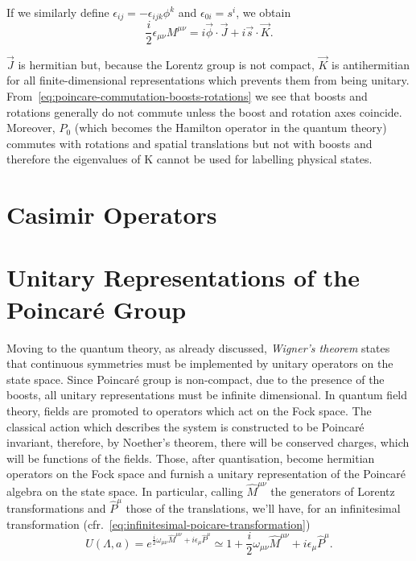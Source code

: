 If we similarly define $\epsilon_{ij} = - \epsilon_{ijk} \phi^k$ and $\epsilon_{0i} = s^i$, we obtain
\begin{equation}
    \frac{i}{2} \epsilon_{\mu\nu} M^{\mu\nu} = i \vec{\phi} \cdot \vec{J} + i \vec{s} \cdot \vec{K}.
\end{equation}

$\vec{J}$ is hermitian but, because the Lorentz group is not compact, $\vec{K}$ is antihermitian for all finite-dimensional representations which prevents them from being unitary. From~\eqref{eq:poincare-commutation-boosts-rotations} we see that boosts and rotations generally do not commute unless the boost and rotation axes coincide. Moreover, $P_0$ (which becomes the Hamilton operator in the quantum theory) commutes with rotations and spatial translations but not with boosts and therefore the eigenvalues of K cannot be used for labelling physical states.


\section{Casimir Operators}

\section{Unitary Representations of the Poincaré Group}
Moving to the quantum theory, as already discussed, \emph{Wigner's theorem} states that continuous symmetries must be implemented by unitary operators on the state space. Since Poincaré group is non-compact, due to the presence of the boosts, all unitary representations must be infinite dimensional. In quantum field theory, fields are promoted to operators which act on the Fock space. The classical action which describes the system is constructed to be Poincaré invariant, therefore, by Noether's theorem, there will be conserved charges, which will be functions of the fields. Those, after quantisation, become hermitian operators on the Fock space and furnish a unitary representation of the Poincaré algebra on the state space. In particular, calling $\hat{M}^{\mu\nu}$ the generators of Lorentz transformations and $\hat{P}^\mu$ those of the translations, we'll have, for an infinitesimal transformation (cfr.~\eqref{eq:infinitesimal-poicare-transformation})
\begin{equation}
    U(\Lambda,a) = e^{\frac{i}{2} \omega_{\mu\nu} \hat{M}^{\mu\nu} + i \epsilon_\mu \hat{P}^\mu} \simeq 1 + \frac{i}{2} \omega_{\mu\nu} \hat{M}^{\mu\nu} + i \epsilon_\mu \hat{P}^\mu .
\end{equation}

